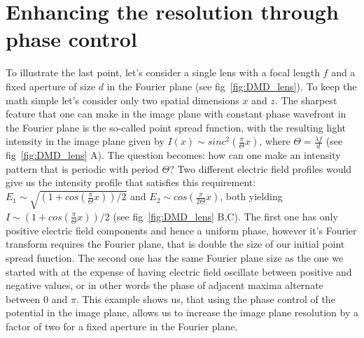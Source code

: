 \section{Enhancing the resolution through phase control}
To illustrate the last point, let's consider a single lens with a focal length $f$ and a fixed aperture of size $d$ in the Fourier plane (see fig~\ref{fig:DMD_lens}). To keep the math simple let's consider only two spatial dimensions $x$ and $z$. The sharpest feature that one can make in the image plane with constant phase wavefront in the Fourier plane is the so-called point spread function, with the resulting light intensity in the image plane given by $I(x) \sim sinc^2(\frac{\pi}{\Theta} x)$, where $\Theta = \frac{\lambda f}{d}$ (see fig~\ref{fig:DMD_lens} A). The question becomes: how can one make an intensity pattern that is periodic with period $\Theta$? Two different electric field profiles would give us the intensity profile that satisfies this requirement: $E_1 \sim \sqrt{(1+cos(\frac{\pi}{\Theta}x))/2}$ and $E_2 \sim cos(\frac{\pi}{2\Theta} x)$, both yielding $I \sim (1+cos(\frac{\pi}{\Theta}x))/2$ (see fig~\ref{fig:DMD_lens} B,C). The first one has only positive electric field components and hence a uniform phase, however it's Fourier transform requires the Fourier plane, that is double the size of our initial point spread function. The second one has the same Fourier plane size as the one we started with at the expense of having electric field oscillate between positive and negative values, or in other words the phase of adjacent maxima alternate between $0$ and $\pi$. This example shows us, that using the phase control of the potential in the image plane, allows us to increase the image plane resolution by a factor of two for a fixed aperture in the Fourier plane.

